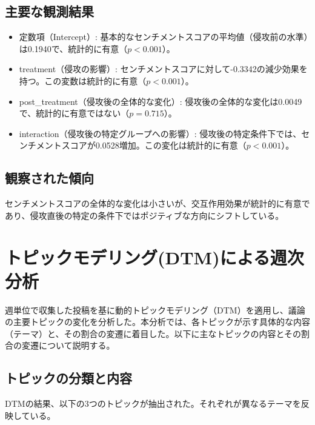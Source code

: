 \documentclass[11pt, a4j]{jreport}
\begin{document}
    \subsection*{主要な観測結果}
    \begin{itemize}
        \item 定数項（Intercept）: 基本的なセンチメントスコアの平均値（侵攻前の水準）は0.1940で、統計的に有意（$p < 0.001$）。
        \item treatment（侵攻の影響）: センチメントスコアに対して-0.3342の減少効果を持つ。この変数は統計的に有意（$p < 0.001$）。
        \item post\_treatment（侵攻後の全体的な変化）: 侵攻後の全体的な変化は0.0049で、統計的に有意ではない（$p = 0.715$）。
        \item interaction（侵攻後の特定グループへの影響）: 侵攻後の特定条件下では、センチメントスコアが0.0528増加。この変化は統計的に有意（$p < 0.001$）。
    \end{itemize}

    \subsection*{観察された傾向}
    センチメントスコアの全体的な変化は小さいが、交互作用効果が統計的に有意であり、侵攻直後の特定の条件下ではポジティブな方向にシフトしている。

    \section{トピックモデリング(DTM)による週次分析}

    週単位で収集した投稿を基に動的トピックモデリング（DTM）を適用し、議論の主要トピックの変化を分析した。本分析では、各トピックが示す具体的な内容（テーマ）と、その割合の変遷に着目した。以下に主なトピックの内容とその割合の変遷について説明する。

    \subsection*{トピックの分類と内容}
    DTMの結果、以下の3つのトピックが抽出された。それぞれが異なるテーマを反映している。
\end{document}
